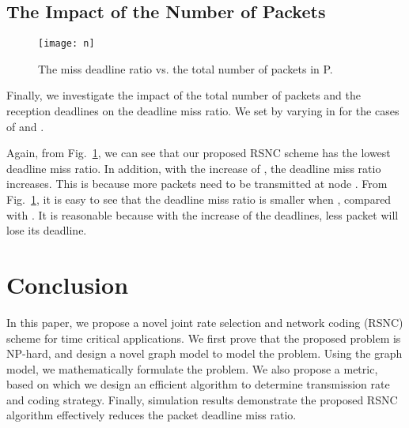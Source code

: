 \documentclass[journal]{IEEEtran}
\begin{document}
\subsection{The Impact of the Number of Packets }\vspace{-0.02in}
\begin{figure}[t]
\begin{center}\vspace{-0.08in}
\texttt{[image: n]}\vspace{-0.1in}
\caption{The miss deadline ratio vs. the total number of packets in P.} \vspace{-0.1in}\vspace{-0.15in}\label{sim.n}
\end{center}\vspace{-0.05in}
\end{figure}

Finally, we investigate the impact of the total number of packets  and the reception deadlines on the deadline miss ratio. We set  by varying  in  for the cases of  and .

Again, from Fig.~\ref{sim.n}, we can see that our proposed RSNC scheme has the lowest deadline miss ratio.
In addition, with the increase of , the deadline miss ratio increases. This is because more packets need to be transmitted
at node . From Fig.~\ref{sim.n}, it is easy to see that the deadline miss ratio is smaller when , compared with . It is reasonable because with the increase of the deadlines, less packet will lose its deadline.

\vspace{-0.12in}
\section{Conclusion}\label{Sec.conclusion}
In this paper, we propose a novel joint rate selection and network coding (RSNC) scheme for time critical applications. We first prove that the proposed problem is NP-hard, and design a novel graph model to model the problem. Using the graph model, we mathematically formulate the problem. We also propose a metric, based on which we design an efficient algorithm to determine transmission rate and coding strategy. Finally, simulation results demonstrate the proposed RSNC algorithm effectively reduces the packet deadline miss ratio.

\vspace{-0.07in}
\end{document}
